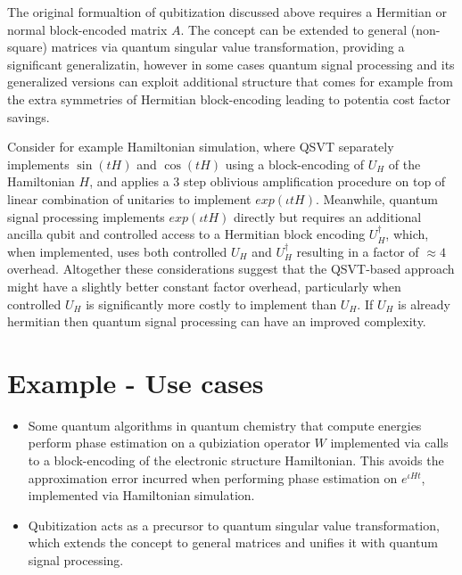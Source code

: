 \documentclass[12pt, oneside]{book}
\theoremstyle{definition}
\theoremstyle{definition}
\theoremstyle{remark}
\begin{document}
\begin{importantnote}
    The original formualtion of qubitization discussed above requires a Hermitian or normal block-encoded matrix $A$. The concept can be extended to general (non-square) matrices via quantum singular value transformation, providing a significant generalizatin, however in some cases quantum signal processing and its generalized versions can exploit additional structure that comes for example from the extra symmetries of Hermitian block-encoding leading to potentia cost factor savings. 

    Consider for example Hamiltonian simulation, where QSVT separately implements $\sin(tH)$ and $\cos(tH)$ using a block-encoding of $U_H$ of the Hamiltonian $H$, and applies a $3$ step oblivious amplification procedure on top of linear combination of unitaries to implement $exp(\iota tH)$. Meanwhile, quantum signal processing implements $exp(\iota tH)$ directly but requires an additional ancilla qubit and controlled access to a Hermitian block encoding $U_H^{\dagger}$, which, when implemented, uses both controlled $U_H$ and $U_H^{\dagger}$ resulting in a factor of $\approx 4$ overhead. Altogether these considerations suggest that the QSVT-based approach might have a slightly better constant factor overhead, particularly when controlled $U_H$ is significantly more costly to implement than $U_H$. If $U_H$ is already hermitian then quantum signal processing can have an improved complexity.
\end{importantnote}

\section{Example - Use cases}
\begin{itemize}
    \item Some quantum algorithms in quantum chemistry that compute energies perform phase estimation on a qubiziation operator $W$ implemented via calls to a block-encoding of the electronic structure Hamiltonian. This avoids the approximation error incurred when performing phase estimation on $e^{\iota Ht}$, implemented via Hamiltonian simulation.
    \item Qubitization acts as a precursor to quantum singular value transformation, which extends the concept to general matrices and unifies it with quantum signal processing.
\end{itemize}
\end{document}
